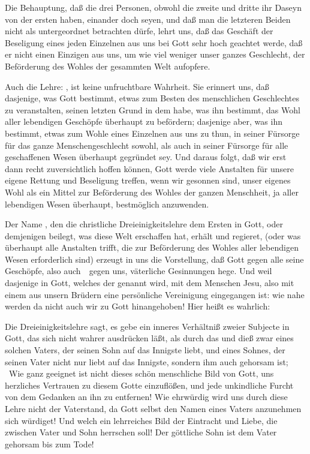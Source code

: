 \begin{aufza}
\item Die Behauptung, daß die drei Personen, obwohl die zweite und dritte ihr Daseyn von der ersten haben, einander doch  seyen, und daß man die letzteren Beiden nicht als untergeordnet betrachten dürfe, lehrt uns, daß das Geschäft der Beseligung eines jeden Einzelnen aus uns bei Gott sehr hoch geachtet werde, daß er nicht einen Einzigen aus uns, um wie viel weniger unser ganzes Geschlecht, der Beförderung des Wohles der gesammten Welt aufopfere.
\item Auch die Lehre: , ist keine unfruchtbare Wahrheit. Sie erinnert uns, daß dasjenige, was Gott bestimmt, etwas zum Besten des menschlichen Geschlechtes zu veranstalten, seinen letzten Grund in dem habe, was ihn bestimmt, das Wohl aller lebendigen Geschöpfe überhaupt zu befördern; dasjenige aber, was ihn bestimmt, etwas zum Wohle eines Einzelnen aus uns zu thun, in seiner Fürsorge für das ganze Menschengeschlecht sowohl, als auch in seiner Fürsorge für alle geschaffenen Wesen überhaupt gegründet sey. Und daraus folgt, daß wir erst dann recht zuversichtlich hoffen können, Gott werde viele Anstalten für unsere eigene Rettung und Beseligung treffen, wenn wir gesonnen sind, unser eigenes Wohl als ein Mittel zur Beförderung des Wohles der ganzen Menschheit, ja aller lebendigen Wesen überhaupt, bestmöglich anzuwenden.
\item Der Name , den die christliche Dreieinigkeitslehre dem Ersten in Gott, oder demjenigen beilegt, was diese Welt erschaffen hat, erhält und regieret, (oder was überhaupt alle Anstalten trifft, die zur Beförderung des Wohles aller lebendigen Wesen erforderlich sind) erzeugt in uns die Vorstellung, daß Gott gegen alle seine Geschöpfe, also auch~\ gegen uns, väterliche Gesinnungen hege. Und weil dasjenige in Gott, welches der  genannt wird, mit dem Menschen Jesu, also mit einem aus unsern Brüdern eine persönliche Vereinigung eingegangen ist: wie nahe werden da nicht auch wir zu Gott hinangehoben! Hier heißt es wahrlich:  
\item Die Dreieinigkeitslehre sagt, es gebe ein inneres Verhältniß zweier Subjecte in Gott, das sich nicht wahrer ausdrücken läßt, als durch das  und dieß zwar eines solchen Vaters, der seinen Sohn auf das Innigste liebt, und eines Sohnes, der seinen Vater nicht nur liebt auf das Innigste, sondern ihm auch gehorsam ist; \usw\ Wie ganz geeignet ist nicht dieses schön menschliche Bild von Gott, uns herzliches Vertrauen zu diesem Gotte einzuflößen, und jede unkindliche Furcht von dem Gedanken an ihn zu entfernen! Wie ehrwürdig wird uns durch diese Lehre nicht der Vaterstand, da Gott selbst den Namen eines Vaters anzunehmen sich würdiget! Und welch ein lehrreiches Bild der Eintracht und Liebe, die zwischen Vater und Sohn herrschen soll! Der göttliche Sohn ist dem Vater gehorsam bis zum Tode!

\end{aufza}
